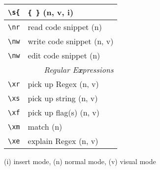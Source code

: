 \documentclass[oneside,11pt,a4paper,DIV23]{scrartcl}
\begin{document}
\begin{center}
\begin{tabular}[]{|p{12mm}|p{58mm}|}
\hline \verb'\s{'  & \verb'{ }'                        \hfill (n, v, i)\\
\hline
\hline \verb'\nr'  & read code snippet                 \hfill (n)\\
\hline \verb'\nw'  & write code snippet                \hfill (n, v)\\
\hline \verb'\nw'  & edit code snippet                 \hfill (n)\\
\hline
\hline
\multicolumn{2}{|r|}{\textsl{Regular E\textbf{x}pressions}} \\
\hline \verb'\xr' &  pick up Regex             \hfill (n, v)\\
\hline \verb'\xs' &  pick up string            \hfill (n, v)\\
\hline \verb'\xf' &  pick up flag(s)           \hfill (n, v)\\
\hline \verb'\xm' &  match                     \hfill (n)\\
\hline \verb'\xe' &  explain Regex             \hfill (n, v)\\
\hline
\end{tabular}%
\begin{flushleft}
{\footnotesize
{\normalsize (i)} insert mode, {\normalsize (n)} normal mode, {\normalsize (v)} visual mode
}%
\end{flushleft}

\newpage 
\begin{tabular}[]{l}
\end{tabular} \\ 


\end{center}
\end{document}

